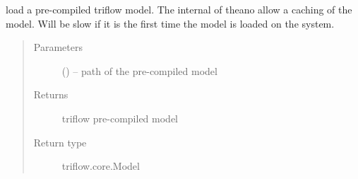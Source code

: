 \documentclass[letterpaper,10pt,english]{sphinxmanual}
\begin{document}
\begin{fulllineitems}
\begin{sphinxVerbatim}[commandchars=\\\{\}]
   
  \PYG{p}{[}
               \PYG{p}{]}
               \PYG{p}{[} \PYG{p}{]} \PYG{p}{[}   \PYG{p}{]}
\end{sphinxVerbatim}

\begin{fulllineitems}
\end{fulllineitems}


\begin{fulllineitems}
\label{\detokenize{triflow.core:triflow.core.model.Model.load}}
load a pre-compiled triflow model. The internal of theano allow a
caching of the model. Will be slow if it is the first time the model is
loaded on the system.
\begin{quote}\begin{description}
\item[{Parameters}] \leavevmode
{} () -- path of the pre-compiled model

\item[{Returns}] \leavevmode
triflow pre-compiled model

\item[{Return type}] \leavevmode
triflow.core.Model

\end{description}\end{quote}


\end{fulllineitems}
\end{fulllineitems}
\end{document}
